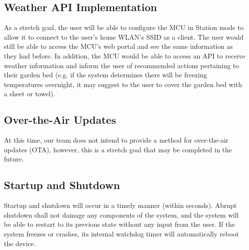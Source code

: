 \subsection{Weather API Implementation}
As a stretch goal, the user will be able to configure the MCU in Station mode to allow it to connect to the user's home WLAN's SSID as a client. The user would still be able to access the MCU's web portal and see the same information as they had before. In addition, the MCU would be able to access an API to receive weather information and inform the user of recommended actions pertaining to their garden bed (e.g. if the system determines there will be freezing temperatures overnight, it may suggest to the user to cover the garden bed with a sheet or towel).

\subsection{Over-the-Air Updates}
At this time, our team does not intend to provide a method for over-the-air updates (OTA), however, this is a stretch goal that may be completed in the future.

\subsection{Startup and Shutdown} Startup and shutdown will occur in a timely manner (within seconds). Abrupt shutdown shall not damage any components of the system, and the system will be able to restart to its previous state without any input from the user. If the system freezes or crashes, its internal watchdog timer will automatically reboot the device.

